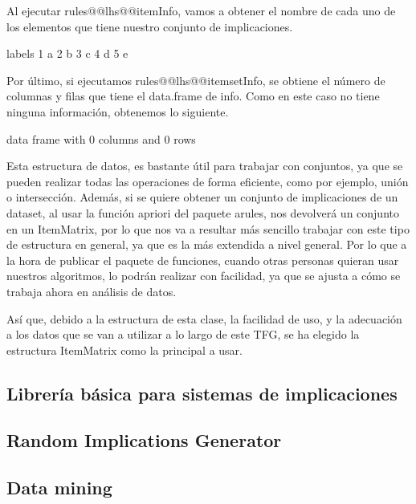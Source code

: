 Al ejecutar rules@@lhs@@itemInfo, vamos a obtener el nombre de cada uno de los elementos que 
tiene nuestro conjunto de implicaciones. 

labels
1      a
2      b
3      c
4      d
5      e


Por \'ultimo, si ejecutamos rules@@lhs@@itemsetInfo, se obtiene el n\'umero de columnas y filas 
que tiene el data.frame de info. 
Como en este caso no tiene ninguna informaci\'on, obtenemos lo siguiente.

data frame with 0 columns and 0 rows



Esta estructura de datos, es bastante \'util para trabajar con conjuntos, ya que se pueden 
realizar todas las operaciones de forma eficiente, como por ejemplo, uni\'on o intersecci\'on.
Adem\'as, si se quiere obtener un conjunto de implicaciones de un dataset, al usar la funci\'on 
apriori del paquete arules, nos devolver\'a un conjunto en un ItemMatrix, por lo que nos va a 
resultar m\'as sencillo trabajar con este tipo de estructura en general, ya que es la m\'as 
extendida a nivel general. Por lo que a la hora de publicar el paquete de funciones, cuando otras 
personas quieran usar nuestros algoritmos, lo podr\'an realizar con facilidad, ya que se ajusta 
a c\'omo se trabaja ahora en an\'alisis de datos.

As\'i que, debido a la estructura de esta clase, la facilidad de uso, y la adecuaci\'on a 
los datos que se van a utilizar a lo largo de este TFG, se ha elegido la estructura ItemMatrix 
como la principal a usar. 















\subsection{Librer\'ia b\'asica para sistemas de implicaciones}


\subsection{Random Implications Generator}


\subsection{Data mining}




\newpage
\thispagestyle{empty}
\mbox{}

\newpage